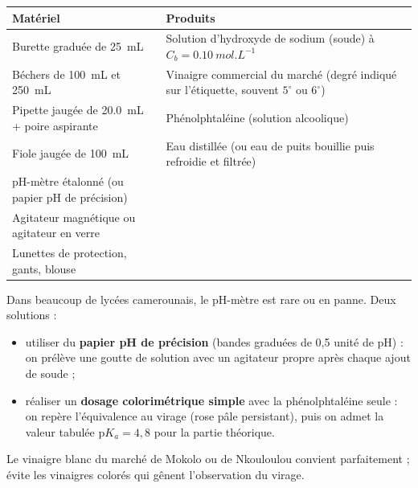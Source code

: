 \documentclass[11pt]{article}
\newcounter{popsec}
\newcounter{popsub}
\newcommand{\courssub}[1]{%
  \stepcounter{popsub}%
  \par\vspace{9pt}\noindent{\popxbold\fontsize{11.5}{13}\selectfont\color{popink}{\color{poporange}\thepopsec.\thepopsub}\hspace{6pt}#1}\par\nopagebreak\vspace{4pt}
}
\begin{document}
\begin{center}
\begin{tabularx}{\linewidth}{|l|X|}
\hline
\rowcolor{popblue!40} \textbf{Matériel} & \textbf{Produits} \\
\hline
Burette graduée de \SI{25}{mL} & Solution d'hydroxyde de sodium (soude) à $C_b = \SI{0,10}{mol.L^{-1}}$ \\
Béchers de \SI{100}{mL} et \SI{250}{mL} & Vinaigre commercial du marché (degré indiqué sur l'étiquette, souvent $5^{\circ}$ ou $6^{\circ}$) \\
Pipette jaugée de \SI{20,0}{mL} + poire aspirante & Phénolphtaléine (solution alcoolique) \\
Fiole jaugée de \SI{100}{mL} & Eau distillée (ou eau de puits bouillie puis refroidie et filtrée) \\
pH-mètre étalonné (ou papier pH de précision) & \\
Agitateur magnétique ou agitateur en verre & \\
Lunettes de protection, gants, blouse & \\
\hline
\end{tabularx}
\end{center}

\begin{savaistu}
Dans beaucoup de lycées camerounais, le pH-mètre est rare ou en panne. Deux solutions :
\begin{itemize}
\item utiliser du \textbf{papier pH de précision} (bandes graduées de 0,5 unité de pH) : on prélève une goutte de solution avec un agitateur propre après chaque ajout de soude ;
\item réaliser un \textbf{dosage colorimétrique simple} avec la phénolphtaléine seule : on repère l'équivalence au virage (rose pâle persistant), puis on admet la valeur tabulée $\mathrm{p}K_a = 4{,}8$ pour la partie théorique.
\end{itemize}
Le vinaigre blanc du marché de Mokolo ou de Nkouloulou convient parfaitement ; évite les vinaigres colorés qui gênent l'observation du virage.
\end{savaistu}

\courssub{Sécurité}
\end{document}

